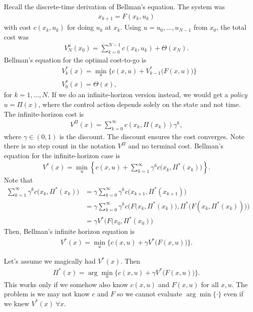 Recall the discrete-time derivation of Bellman's equation. The system was
\begin{gather}
  x_{k+1} = F(x_k,u_k)
\end{gather}
with cost $c(x_k,u_k)$ for doing $u_k$ at $x_k$. Using $u=u_0,\dots,u_{N-1}$ from $x_0$, the total cost was
\begin{gather}
  V_N^u (x_0) = \sum_{k=0}^{N-1} c(x_k,u_k) + \Theta(x_N).
\end{gather}
Bellman's equation for the optimal cost-to-go is
\begin{align}
  & V_k^* (x) = \min_u \Big\{ c(x,u) + V_{k-1}^* \big( F(x,u) \big) \Big\} \\
  & V_0^* (x) = \Theta(x),
\end{align}
for $k=1,\dots,N$. If we do an infinite-horizon version instead, we would get a \emph{policy} $u = \Pi(x)$, where the control action depends solely on the state and not time. The infinite-horizon cost is
\begin{gather}
  V^\Pi (x) = \sum_{k=0}^\infty c(x_k,\Pi(x_k)) \gamma^k,
\end{gather}
where $\gamma\in(0,1)$ is the discount. The discount ensures the cost converges. Note there is no step count in the notation $V^\Pi$ and no terminal cost. Bellman's equation for the infinite-horizon case is
\begin{gather}
  V^* (x) = \min_u \left\{ c(x,u) + \sum_{k=1}^\infty \gamma^k c\big(x_k,\Pi^*(x_k)\big) \right\}.
\end{gather}
Note that
\begin{align}
  \sum_{k=1}^\infty \gamma^k c\big(x_k,\Pi^*(x_k)\big) &= \gamma \sum_{k=0}^\infty \gamma^k c\big(x_{k+1},\Pi^*(x_{k+1})\big) \\
                                                       &= \gamma \sum_{k=0}^\infty \gamma^k c \Big( F\big(x_k,\Pi^*(x_k)\big), \Pi^*\big(F(x_k,\Pi^*(x_k))\big) \Big) \\
  &= \gamma V^*\big(F(x_0,\Pi^*(x_0)\big)
\end{align}
Then, Bellman's infinite horizon equation is
\begin{gather}
  V^*(x) = \min_u \Big\{ c(x,u) + \gamma V^*\big(F(x,u)\big) \Big\}.
\end{gather}

Let's assume we magically had $V^*(x)$. Then
\begin{gather}
  \Pi^*(x) = \arg\min_u \Big\{ c(x,u) + \gamma V^*\big(F(x,u)\big) \Big\}.
\end{gather}
This works only if we somehow also know $c(x,u)$ and $F(x,u)$ for all $x,u$. The problem is we may not know $c$ and $F$ so we cannot evaluate $\arg\min\{\cdot\}$ even if we knew $V^*(x)\ \forall x$.

